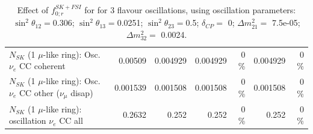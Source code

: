 \begin{table}
\begin{tabular}{| l | r | r | r  r | r  r |}
                          $N_{SK}$ (1 $\mu$-like ring): Osc. $\nu_e$ CC coherent &         0.00509 &        0.004929 &        0.004929 &        0 \%  &        0.004929 &        0 \%  \\ 
           $N_{SK}$ (1 $\mu$-like ring): Osc. $\nu_e$ CC other ($\nu_\mu$ disap) &        0.001539 &        0.001508 &        0.001508 &        0 \%  &        0.001508 &        0 \%  \\ 
                        $N_{SK}$ (1 $\mu$-like ring): oscillation $\nu_e$ CC all &          0.2632 &           0.252 &           0.252 &        0 \%  &           0.252 &        0 \%  \\ 
\hline
\hline
\end{tabular}
\caption{ Effect of $f_{0; r}^{SK+FSI}$ for for 3 flavour oscillations, using oscillation parameters:  $\sin^2\theta_{12} = $0.306; $\sin^2\theta_{13} = $0.0251; $\sin^2\theta_{23} = $0.5; $\delta_{CP} = $        0; $\Delta m^2_{21} = $    7.5e-05; $\Delta m^2_{32} = $    0.0024. }
\label{tab:num_skdetfsi_000_1RmuT_3f_osc_t13:0.0251_spectralreco_spectraltrue}
\end{table}
\clearpage
